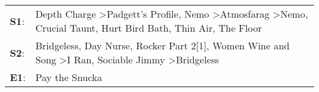 \begin{supertabular}{p{0.03\textwidth}p{0.92\textwidth}}
 \textbf{S1}:  &  Depth Charge\textsuperscript{} \textgreater \enspace Padgett's Profile\textsuperscript{}, \enspace Nemo\textsuperscript{} \textgreater \enspace Atmosfarag\textsuperscript{} \textgreater \enspace Nemo\textsuperscript{}, \enspace Crucial Taunt\textsuperscript{}, \enspace Hurt Bird Bath\textsuperscript{}, \enspace Thin Air\textsuperscript{}, \enspace The Floor\textsuperscript{}  \enspace  \\
 \textbf{S2}:  &                                                                                Bridgeless\textsuperscript{}, \enspace Day Nurse\textsuperscript{}, \enspace Rocker Part 2[1]\textsuperscript{}, \enspace Women Wine and Song\textsuperscript{} \textgreater \enspace I Ran\textsuperscript{}, \enspace Sociable Jimmy\textsuperscript{} \textgreater \enspace Bridgeless\textsuperscript{}  \enspace  \\
 \textbf{E1}:  &                                                                                                                                                                                                                                                                                                                                                           Pay the Snucka\textsuperscript{}  \enspace  \\
\end{supertabular}
